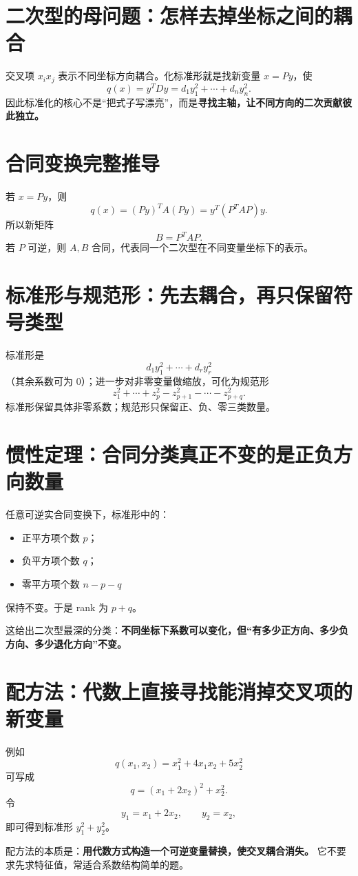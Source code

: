 \documentclass[11pt,a4paper,openany]{ctexbook}
\newcommand{\key}[1]{\textbf{\color{deep}#1}}
\begin{document}
\section{二次型的母问题：怎样去掉坐标之间的耦合}
交叉项 $x_ix_j$ 表示不同坐标方向耦合。化标准形就是找新变量 $x=Py$，使
\[
q(x)=y^TDy=d_1y_1^2+\cdots+d_ny_n^2.
\]
因此标准化的核心不是“把式子写漂亮”，而是\key{寻找主轴，让不同方向的二次贡献彼此独立。}

\section{合同变换完整推导}
若 $x=Py$，则
\[
q(x)=(Py)^TA(Py)=y^T(P^TAP)y.
\]
所以新矩阵
\[
\boxed{B=P^TAP}.
\]
若 $P$ 可逆，则 $A,B$ 合同，代表同一个二次型在不同变量坐标下的表示。

\section{标准形与规范形：先去耦合，再只保留符号类型}
标准形是
\[
d_1y_1^2+\cdots+d_ry_r^2
\]
（其余系数可为 0）；进一步对非零变量做缩放，可化为规范形
\[
z_1^2+\cdots+z_p^2-z_{p+1}^2-\cdots-z_{p+q}^2.
\]
标准形保留具体非零系数；规范形只保留正、负、零三类数量。

\section{惯性定理：合同分类真正不变的是正负方向数量}
任意可逆实合同变换下，标准形中的：
\begin{itemize}
  \item 正平方项个数 $p$；
  \item 负平方项个数 $q$；
  \item 零平方项个数 $n-p-q$
\end{itemize}
保持不变。于是 rank 为 $p+q$。

这给出二次型最深的分类：\key{不同坐标下系数可以变化，但“有多少正方向、多少负方向、多少退化方向”不变。}

\section{配方法：代数上直接寻找能消掉交叉项的新变量}
例如
\[
q(x_1,x_2)=x_1^2+4x_1x_2+5x_2^2
\]
可写成
\[
q=(x_1+2x_2)^2+x_2^2.
\]
令
\[
y_1=x_1+2x_2,\qquad y_2=x_2,
\]
即可得到标准形 $y_1^2+y_2^2$。

配方法的本质是：\key{用代数方式构造一个可逆变量替换，使交叉耦合消失。} 它不要求先求特征值，常适合系数结构简单的题。
\end{document}
